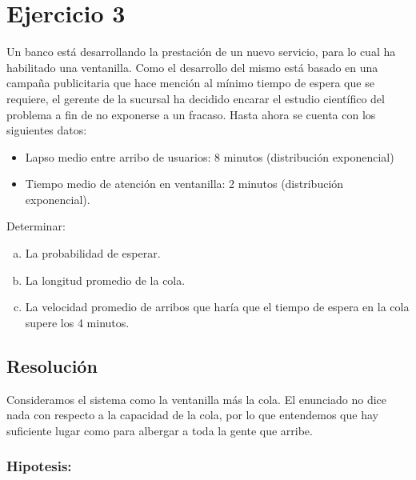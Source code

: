 \documentclass[a4paper,11pt]{article}
\begin{document}
\vspace{35pt}
\section*{\textbf{Ejercicio 3}}

Un banco está desarrollando la prestación de un nuevo servicio, para lo cual ha
habilitado una ventanilla. Como el desarrollo del mismo está basado en una
campaña publicitaria que hace mención al mínimo tiempo de espera que se
requiere, el gerente de la sucursal ha decidido encarar el estudio científico
del problema a fin de no exponerse a un fracaso. Hasta ahora se cuenta con los
siguientes datos:

\leftskip=36pt
\parindent=-18pt
\begin{itemize}
  \item Lapso medio entre arribo de usuarios: 8 minutos (distribución
    exponencial)
  \item Tiempo medio de atención en ventanilla: 2 minutos (distribución
    exponencial).
\end{itemize}

\leftskip=0pt
\parindent=0pt
Determinar:

\leftskip=36pt
\parindent=-18pt
\begin{enumerate}[a)]
  \item La probabilidad de esperar.
  \item La longitud promedio de la cola.
  \item La velocidad promedio de arribos que haría que el tiempo de espera en
    la cola supere los 4 minutos.
\end{enumerate}

\vspace{13pt}
\leftskip=0pt
\parindent=0pt
\subsection*{\textbf{Resolución}}

Consideramos el sistema como la ventanilla más la cola. El enunciado no dice
nada con respecto a la capacidad de la cola, por lo que entendemos que hay
suficiente lugar como para albergar a toda la gente que arribe.

\vspace{5pt}
\subsubsection*{Hipotesis:}
\end{document}
